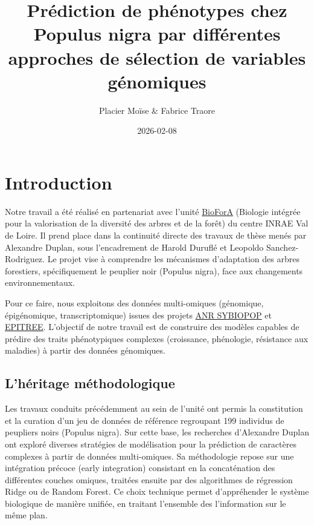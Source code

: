 \documentclass[
  11pt,
  letterpaper,
  DIV=11,
  numbers=noendperiod]{scrartcl}
\title{Prédiction de phénotypes chez Populus nigra par différentes
approches de sélection de variables génomiques}
\author{Placier Moïse \& Fabrice Traore}
\date{2026-02-08}
\renewcommand*\contentsname{Table des matières}
\newcommand\contentsname{Table des matières}
\begin{document}
\maketitle
\ifdefined\Shaded\renewenvironment{Shaded}{\begin{tcolorbox}[enhanced, interior hidden, borderline west={3pt}{0pt}{shadecolor}, breakable, boxrule=0pt, frame hidden, sharp corners]}{\end{tcolorbox}}\fi

\renewcommand*\contentsname{Table des Matières}
{
\hypersetup{linkcolor=}
\setcounter{tocdepth}{3}
\tableofcontents
}
\hypertarget{introduction}{%
\section{Introduction}\label{introduction}}

Notre travail a été réalisé en partenariat avec l'unité
\href{https://biofora.val-de-loire.hub.inrae.fr/}{BioForA} (Biologie
intégrée pour la valorisation de la diversité des arbres et de la forêt)
du centre INRAE Val de Loire. Il prend place dans la continuité directe
des travaux de thèse menés par Alexandre Duplan, sous l'encadrement de
Harold Duruflé et Leopoldo Sanchez-Rodriguez. Le projet vise à
comprendre les mécanismes d'adaptation des arbres forestiers,
spécifiquement le peuplier noir (Populus nigra), face aux changements
environnementaux.

Pour ce faire, nous exploitons des données multi-omiques (génomique,
épigénomique, transcriptomique) issues des projets
\href{https://anr.fr/Projet-ANR-13-JSV6-0001}{ANR SYBIOPOP} et
\href{https://epitree-project.hub.inrae.fr/}{EPITREE}. L'objectif de
notre travail est de construire des modèles capables de prédire des
traits phénotypiques complexes (croissance, phénologie, résistance aux
maladies) à partir des données génomiques.

\hypertarget{lhuxe9ritage-muxe9thodologique}{%
\subsection{L'héritage
méthodologique}\label{lhuxe9ritage-muxe9thodologique}}

Les travaux conduits précédemment au sein de l'unité ont permis la
constitution et la curation d'un jeu de données de référence regroupant
199 individus de peupliers noirs (Populus nigra). Sur cette base, les
recherches d'Alexandre Duplan ont exploré diverses stratégies de
modélisation pour la prédiction de caractères complexes à partir de
données multi-omiques. Sa méthodologie repose sur une intégration
précoce (early integration) consistant en la concaténation des
différentes couches omiques, traitées ensuite par des algorithmes de
régression Ridge ou de Random Forest. Ce choix technique permet
d'appréhender le système biologique de manière unifiée, en traitant
l'ensemble des l'information sur le même plan.
\end{document}
